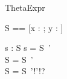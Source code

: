 \begin{zsection}
  \SECTION ThetaExpr
\end{zsection}

\begin{zed}
  S == [x : \nat; y : \power \nat]
\end{zed}

\begin{axdef}
  s : S
\where
  s = \theta S~'\\
  \theta S = \theta S~'\\
  \theta S = \theta S~'!'!?
\end{axdef}
